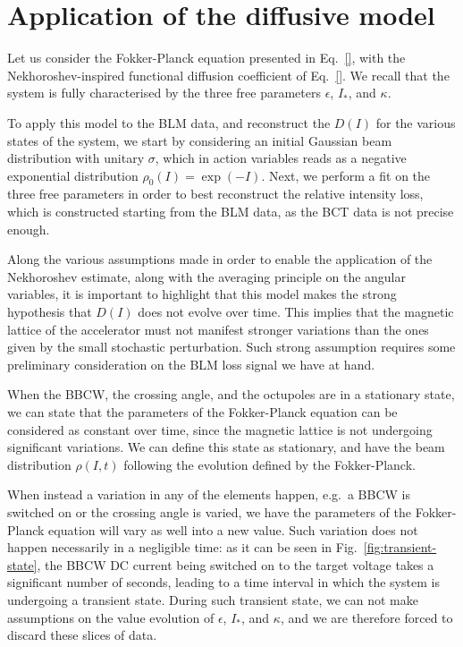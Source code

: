 \section{Application of the diffusive model}

Let us consider the Fokker-Planck equation presented in Eq.~\eqref{}, with the Nekhoroshev-inspired functional diffusion coefficient of Eq.~\eqref{}. We recall that the system is fully characterised by the three free parameters $\epsilon$, $I_\ast$, and $\kappa$.

To apply this model to the BLM data, and reconstruct the $D(I)$ for the various states of the system, we start by considering an initial Gaussian beam distribution with unitary $\sigma$, which in action variables reads as a negative exponential distribution $\rho_0(I) = \exp(-I)$. Next, we perform a fit on the three free parameters in order to best reconstruct the relative intensity loss, which is constructed starting from the BLM data, as the BCT data is not precise enough.

Along the various assumptions made in order to enable the application of the Nekhoroshev estimate, along with the averaging principle on the angular variables, it is important to highlight that this model makes the strong hypothesis that $D(I)$ does not evolve over time. This implies that the magnetic lattice of the accelerator must not manifest stronger variations than the ones given by the small stochastic perturbation. Such strong assumption requires some preliminary consideration on the BLM loss signal we have at hand.

When the BBCW, the crossing angle, and the octupoles are in a stationary state, we can state that the parameters of the Fokker-Planck equation can be considered as constant over time, since the magnetic lattice is not undergoing significant variations. We can define this state as stationary, and have the beam distribution $\rho(I, t)$ following the evolution defined by the Fokker-Planck.

When instead a variation in any of the elements happen, e.g.\ a BBCW is switched on or the crossing angle is varied, we have the parameters of the Fokker-Planck equation will vary as well into a new value. Such variation does not happen necessarily in a negligible time: as it can be seen in Fig.~\ref{fig:transient-state}, the BBCW DC current being switched on to the target voltage takes a significant number of seconds, leading to a time interval in which the system is undergoing a transient state. During such transient state, we can not make assumptions on the value evolution of $\epsilon$, $I_\ast$, and $\kappa$, and we are therefore forced to discard these slices of data.


